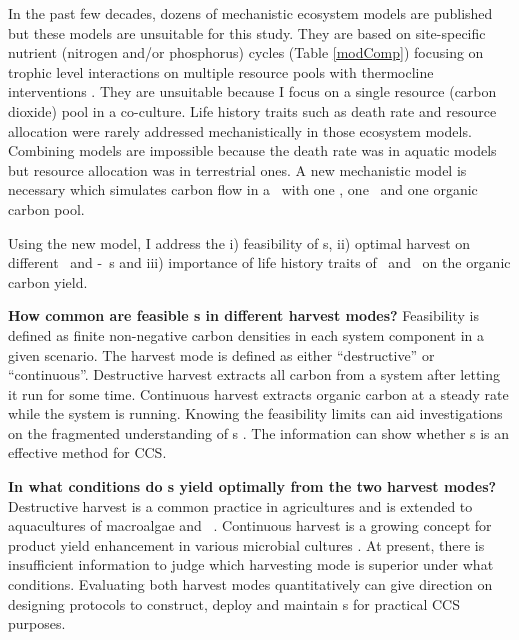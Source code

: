 \documentclass[../thesis.tex]{subfiles} %
\begin{document}
In the past few decades, dozens of mechanistic ecosystem models are published but these models are unsuitable for this study.  They are based on site-specific nutrient (nitrogen and/or phosphorus) cycles (Table \ref{modComp}) focusing on trophic level interactions on multiple resource pools \autocite{llebot2010role,mitra2009closure,findlay2006modelling} with thermocline interventions \autocite{anderson2015empower,kidston2013phytoplankton,llebot2010role}.  They are unsuitable because I focus on a single resource (carbon dioxide) pool in a co-culture.  Life history traits such as death rate \autocite{anderson2015empower,kidston2013phytoplankton} and resource allocation \autocite{xiao1996relative} were rarely addressed mechanistically in those ecosystem models.  Combining models are impossible because the death rate was in aquatic models but resource allocation was in terrestrial ones.  A new mechanistic model is necessary which simulates carbon flow in a \pbs\ with one \phy, one \bacm\ and one organic carbon pool.

Using the new model, I address the \Rn{1}) feasibility of \pbs s, \Rn{2}) optimal harvest on different \phy\ and \phy-\bac\ \pbs s and \Rn{3}) importance of life history traits of \phy\ and \bac\ on the organic carbon yield.

\textbf{How common are feasible \pbs s in different harvest modes?}  Feasibility is defined as finite non-negative carbon densities in each system component in a given scenario.  The harvest mode is defined as either ``destructive” or ``continuous”.  Destructive harvest extracts all carbon from a system after letting it run for some time.  Continuous harvest extracts organic carbon at a steady rate while the system is running.  Knowing the feasibility limits can aid investigations on the fragmented understanding of \pbs s \autocite{fuentes2016impact}.  The information can show whether \pbs s is an effective method for CCS.

\textbf{In what conditions do \pbs s yield optimally from the two harvest modes?}  Destructive harvest is a common practice in agricultures and is extended to aquacultures of macroalgae \autocite{duarte2017can} and \phy\  \autocite{evanson_2019}.  Continuous harvest is a growing concept for product yield enhancement in various microbial cultures \autocite{aytekin2016statistical,fuentes2016impact}.  At present, there is insufficient information to judge which harvesting mode is superior under what conditions.  Evaluating both harvest modes quantitatively can give direction on designing protocols to construct, deploy and maintain \pbs s for practical CCS purposes.
\end{document}
